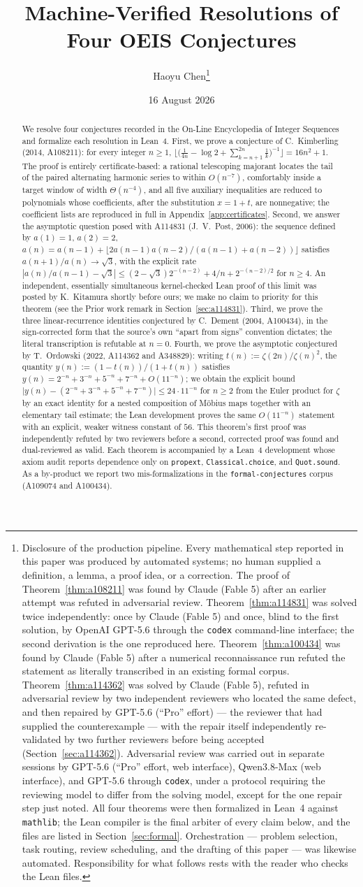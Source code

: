 \documentclass[11pt]{article}
\title{Machine-Verified Resolutions of Four OEIS Conjectures}
\author{Haoyu Chen\thanks{%
Disclosure of the production pipeline. Every mathematical step reported in this paper was
produced by automated systems; no human supplied a definition, a lemma, a proof idea, or a
correction. The proof of Theorem~\ref{thm:a108211} was found by Claude (Fable 5) after an
earlier attempt was refuted in adversarial review. Theorem~\ref{thm:a114831} was solved twice
independently: once by Claude (Fable 5) and once, blind to the first solution, by OpenAI
GPT-5.6 through the \texttt{codex} command-line interface; the second derivation is the one
reproduced here. Theorem~\ref{thm:a100434} was found by Claude (Fable 5) after a numerical
reconnaissance run refuted the statement as literally transcribed in an existing formal
corpus. Theorem~\ref{thm:a114362} was solved by Claude (Fable 5), refuted in adversarial review
by two independent reviewers who located the same defect, and then repaired by GPT-5.6
(``Pro'' effort) --- the reviewer that had supplied the counterexample --- with the repair itself
independently re-validated by two further reviewers before being accepted
(Section~\ref{sec:a114362}). Adversarial review was carried out in separate sessions by GPT-5.6
(``Pro'' effort, web interface), Qwen3.8-Max (web interface), and GPT-5.6 through \texttt{codex},
under a protocol requiring the reviewing model to differ from the solving model, except for the
one repair step just noted. All four theorems were then formalized in Lean~4 against
\texttt{mathlib}; the Lean compiler is the final arbiter of every claim below, and the files are
listed in Section~\ref{sec:formal}.
Orchestration --- problem selection, task routing, review scheduling, and the drafting of
this paper --- was likewise automated. Responsibility for what follows rests with the reader
who checks the Lean files.}}
\date{16 August 2026}
\theoremstyle{plain}
\theoremstyle{definition}
\theoremstyle{remark}
\numberwithin{equation}{section}
\begin{document}
\maketitle

\begin{abstract}
We resolve four conjectures recorded in the On-Line Encyclopedia of Integer Sequences and
formalize each resolution in Lean~4. First, we prove a conjecture of C.~Kimberling (2014,
A108211): for every integer $n \ge 1$,
$\bigl\lfloor \bigl(\tfrac{1}{4n} - \log 2 + \sum_{k=n+1}^{2n} \tfrac1k \bigr)^{-1}\bigr\rfloor
= 16n^2+1$. The proof is entirely certificate-based: a rational telescoping majorant locates
the tail of the paired alternating harmonic series to within $O(n^{-7})$, comfortably inside a
target window of width $\Theta(n^{-4})$, and all five auxiliary inequalities are reduced to
polynomials whose coefficients, after the substitution $x = 1+t$, are nonnegative; the
coefficient lists are reproduced in full in Appendix~\ref{app:certificates}. Second, we answer
the asymptotic question posed with A114831 (J.~V.~Post, 2006): the sequence defined by
$a(1)=1$, $a(2)=2$, $a(n) = a(n-1) + \lfloor 2a(n-1)a(n-2)/(a(n-1)+a(n-2))\rfloor$ satisfies
$a(n+1)/a(n) \to \sqrt3$, with the explicit rate
$|a(n)/a(n-1) - \sqrt3| \le (2-\sqrt3)2^{-(n-2)} + 4/n + 2^{-(n-2)/2}$ for $n \ge 4$. An
independent, essentially simultaneous kernel-checked Lean proof of this limit was posted by
K.~Kitamura shortly before ours; we make no claim to priority for this theorem (see the Prior
work remark in Section~\ref{sec:a114831}). Third, we
prove the three linear-recurrence identities conjectured by C.~Dement (2004, A100434), in the
sign-corrected form that the source's own ``apart from signs'' convention dictates; the literal
transcription is refutable at $n=0$. Fourth, we prove the asymptotic conjectured by
T.~Ordowski (2022, A114362 and A348829): writing $t(n) := \zeta(2n)/\zeta(n)^2$, the quantity
$y(n) := (1-t(n))/(1+t(n))$ satisfies $y(n) = 2^{-n}+3^{-n}+5^{-n}+7^{-n}+O(11^{-n})$; we obtain
the explicit bound $\bigl|y(n)-(2^{-n}+3^{-n}+5^{-n}+7^{-n})\bigr| \le 24\cdot11^{-n}$ for $n\ge2$
from the Euler product for $\zeta$ by an exact identity for a nested composition of M\"obius maps
together with an elementary tail estimate; the Lean development proves the same $O(11^{-n})$
statement with an explicit, weaker witness constant of $56$. This theorem's first proof was
independently refuted by two reviewers before a second, corrected proof was found and
dual-reviewed as valid. Each theorem is accompanied by a Lean~4 development whose
axiom audit reports dependence only on \texttt{propext}, \texttt{Classical.choice}, and
\texttt{Quot.sound}. As a by-product we report two mis-formalizations in the
\texttt{formal-conjectures} corpus (A109074 and A100434).
\end{abstract}
\end{document}
